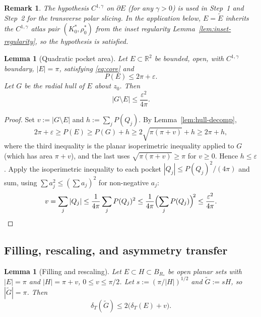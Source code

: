 \documentclass[11pt]{amsart}
\newtheorem{lemma}[theorem]{Lemma}
\newtheorem{remark}[theorem]{Remark}
\newcommand{\R}{\mathbb R}
\newcommand{\dT}{\delta_T}
\newcommand{\eps}{\varepsilon}
\newcommand{\Etil}{\widetilde E}
\newcommand{\Gtil}{\widetilde G}
\begin{document}
\begin{remark}\label{rem:lipschitz}
The hypothesis $C^{1,\gamma}$ on $\partial E$ (for any $\gamma>0$)
is used in Step~1 and Step~2 for the transverse polar slicing.  In
the application below, $E=\Etil$ inherits the $C^{1,\gamma}$ atlas
pair $(K_0^*,\rho_0^*)$ from the inset regularity
Lemma~\ref{lem:inset-regularity}, so the hypothesis is satisfied.
\end{remark}

\begin{lemma}[Quadratic pocket area]\label{lem:pocket}
Let \(E\subset\R^2\) be bounded, open, with \(C^{1,\gamma}\) boundary,
\(|E|=\pi\), satisfying \eqref{eq:core} and
\begin{equation}\label{eq:perim-eps}
   P(E)\le 2\pi+\eps.
\end{equation}
Let \(G\) be the radial hull of \(E\) about \(z_0\).  Then
\begin{equation}\label{eq:pocket-area}
   |G\setminus E|\le\frac{\eps^2}{4\pi}.
\end{equation}
\end{lemma}

\begin{proof}
Set \(v:=|G\setminus E|\) and \(h:=\sum_j P(Q_j)\).  By
Lemma~\ref{lem:hull-decomp},
\[
   2\pi+\eps\ge P(E)\ge P(G)+h\ge 2\sqrt{\pi(\pi+v)}+h\ge 2\pi+h,
\]
where the third inequality is the planar isoperimetric inequality
applied to \(G\) (which has area \(\pi+v\)), and the last uses
\(\sqrt{\pi(\pi+v)}\ge\pi\) for \(v\ge 0\).  Hence \(h\le\eps\).
Apply the isoperimetric inequality to each pocket
\(|Q_j|\le P(Q_j)^2/(4\pi)\) and sum, using \(\sum a_j^2\le
(\sum a_j)^2\) for non-negative \(a_j\):
\[
   v=\sum_j|Q_j|\le\frac1{4\pi}\sum_j P(Q_j)^2
      \le\frac1{4\pi}\Bigl(\sum_j P(Q_j)\Bigr)^{\!2}
      \le\frac{\eps^2}{4\pi}.
\]
\end{proof}

\subsection{Filling, rescaling, and asymmetry transfer}

\begin{lemma}[Filling and rescaling]\label{lem:fill-rescale}
Let \(E\subset H\subset B_{R_*}\) be open planar sets with
\(|E|=\pi\) and \(|H|=\pi+v\), \(0\le v\le \pi/2\).  Let
\(s:=(\pi/|H|)^{1/2}\) and \(\Gtil:=sH\), so \(|\Gtil|=\pi\).  Then
\begin{equation}\label{eq:fill-rescale}
   \dT(\Gtil)\le 2\bigl(\dT(E)+v\bigr).
\end{equation}
\end{lemma}
\end{document}
